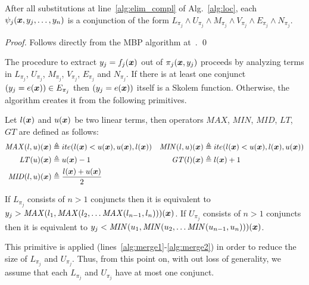 \begin{lemma}
After all substitutions at line~\ref{alg:elim_compl} of Alg.~\ref{alg:loc}, each $\psi_j(\vx,y_{j},\ldots,y_{n})$ is a conjunction of the form
$L_{\pi_j} \land U_{\pi_j} \land M_{\pi_j} \land V_{\pi_j} \land E_{\pi_j} \land N_{\pi_j}$.
\end{lemma}
\begin{proof}
Follows directly from the MBP algorithm at~\cite{komuravelli2014smt}.
\qed
\end{proof}

The procedure to extract $y_j = f_j(\vx)$ out of $\pi_j(\vx,y_{j})$ proceeds by analyzing terms in $L_{\pi_j}$, $U_{\pi_j}$, $M_{\pi_j}$, $V_{\pi_j}$, $E_{\pi_j}$ and $N_{\pi_j}$.
If there is at least one conjunct $(y_j = e(\vx)) \in E_{\pi_j}$ then $(y_j = e(\vx))$ itself is a Skolem function.
Otherwise, the algorithm creates it from the following primitives.

\begin{definition}
Let $l(\vx)$ and $u(\vx)$ be two linear terms,
then operators $\mathit{MAX}$, $\mathit{MIN}$, $\mathit{MID}$, $\mathit{LT}$, $\mathit{GT}$ are defined as follows:
\begin{align*}
\mathit{MAX}(l, u) (\vx) &\triangleq ite (l (\vx) < u (\vx), u(\vx), l(\vx)) \notag &
\mathit{MIN}(l, u) (\vx) &\triangleq ite (l (\vx) < u (\vx), l(\vx), u(\vx)) \notag \\
\mathit{LT} (u) (\vx) &\triangleq u (\vx) -1 \notag &
\mathit{GT} (l) (\vx) &\triangleq l (\vx) + 1 \notag \\
\mathit{MID}(l, u) (\vx) &\triangleq \frac{l(\vx) + u(\vx)}{ 2} \notag 
\end{align*}
\end{definition}

\begin{lemma}
If $L_{\pi_j}$ consists of $n>1$ conjuncts then it is equivalent to $y_j > \mathit{MAX} (l_1, \mathit{MAX} (l_2,\ldots \mathit{MAX} (l_{n-1}, l_n) )) (\vx)$.
If $U_{\pi_j}$ consists of $n>1$ conjuncts then it is equivalent to $y_j < \mathit{MIN} (u_1, \mathit{MIN} (u_2,\ldots \mathit{MIN} (u_{n-1}, u_n) ))(\vx)$.
\end{lemma}
This primitive is applied (lines~\ref{alg:merge1}-\ref{alg:merge2}) in order to reduce the size of $L_{\pi_j}$ and $U_{\pi_j}$.
Thus, from this point on, with out
loss of generality, we assume that each $L_{\pi_j}$ and $U_{\pi_j}$
have at most one conjunct.

